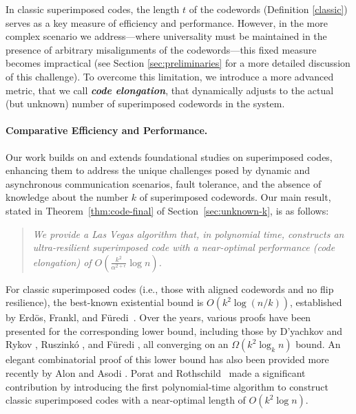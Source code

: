 \documentclass[11pt]{article}
\begin{document}
\medskip
In classic superimposed codes, the length $t$ of the codewords (Definition \ref{classic})
serves as a key measure of efficiency and performance.
However, in the more complex scenario we address—where universality must be maintained in the presence of arbitrary misalignments of the codewords—this fixed measure becomes impractical 
(see Section \ref{sec:preliminaries} for a more detailed discussion of this challenge). 
To overcome this limitation, we introduce a more advanced metric, that we call 
\textbf{\em code elongation}, that dynamically adjusts to the actual (but unknown) 
number of superimposed codewords in the system.






\B
\paragraph*{Comparative Efficiency and Performance.}
Our work builds on and extends foundational studies on superimposed codes, enhancing them to address the unique 
challenges posed by dynamic and asynchronous communication scenarios, fault tolerance, and the absence of knowledge 
about the number $k$ of superimposed codewords. 
Our main result, stated in Theorem~\ref{thm:code-final} of Section~\ref{sec:unknown-k}, is as follows:
\vspace{-0.5ex}
\begin{quote}    
{\em We provide a Las Vegas algorithm that, in polynomial time, 
constructs an ultra-resilient superimposed code with a near-optimal performance (code elongation) 
of $O\left(\frac{k^2}{\alpha^{2+\epsilon}} \log n\right)$.}
\end{quote}

\vspace{-0.5ex}
\noindent


For classic superimposed codes (i.e., those with aligned codewords and no flip resilience), the 
best-known existential bound is $O(k^2 \log(n/k))$, established by Erd{\"o}s, Frankl, 
and F{\"u}redi~\cite{EFF1982}. 
Over the years, various proofs have been presented for the corresponding lower bound, including those by D'yachkov and Rykov \cite{AV1982}, Ruszinkó \cite{R1994}, and Füredi \cite{F1996}, 
all converging on an $\Omega(k^2 \log_k n)$ bound. An elegant combinatorial proof of this lower bound 
has also been provided more recently by Alon and Asodi \cite{AA2005}. Porat and Rothschild~\cite{PR11} 
made a significant contribution by introducing the first polynomial-time algorithm to construct classic 
superimposed codes with a near-optimal length of $O(k^2 \log n)$.
\end{document}
